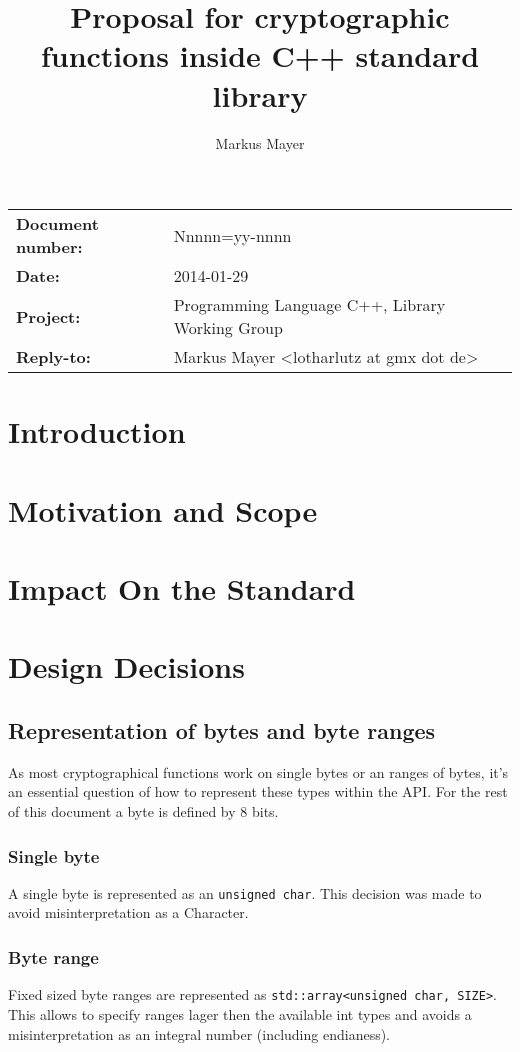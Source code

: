 \documentclass[10pt,letterpaper]{article}
\title{Proposal for cryptographic functions inside C++ standard library}
\author{Markus Mayer}
\begin{document}
\maketitle
\begin{center}
\begin{tabular}[b]{ll}
\textbf{Document number:} & Nnnnn=yy-nnnn \\ 
\textbf{Date:} & 2014-01-29 \\ 
\textbf{Project:} & Programming Language C++, Library Working Group \\ 
\textbf{Reply-to:} & Markus Mayer <lotharlutz at gmx dot de> \\ 
\end{tabular} 
\end{center}
\pagebreak
\tableofcontents
\pagebreak
\section{Introduction}
\section{Motivation and Scope}
\section{Impact On the Standard}
\section{Design Decisions}
\subsection{Representation of bytes and byte ranges}
As most cryptographical functions work on single bytes or an ranges of bytes, it's an essential question of how to represent these types within the API. For the rest of this document a byte is defined by 8 bits.
\subsubsection*{Single byte}
A single byte is represented as an \texttt{unsigned char}. This decision was made to avoid misinterpretation as a Character.

\subsubsection*{Byte range}
Fixed sized byte ranges are represented as \texttt{std::array<unsigned char, SIZE>}. This allows to specify ranges lager then the available int types and avoids a misinterpretation as an integral number (including endianess).
\end{document}
